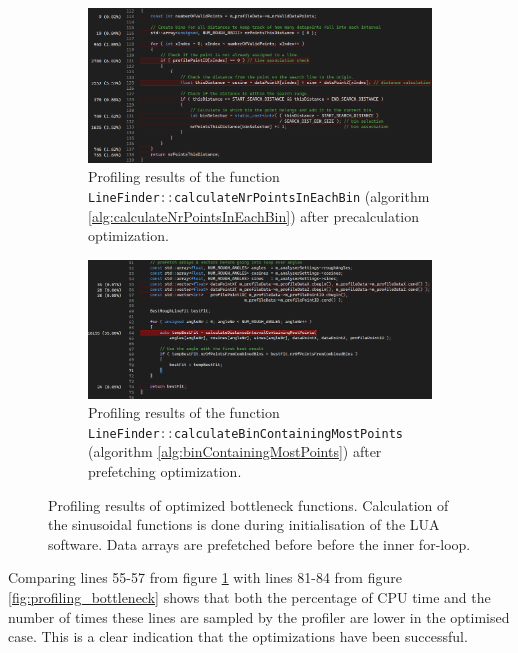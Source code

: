 \begin{figure}[H]
    \centering
    \begin{subfigure}{\textwidth}
        \centering
        \includegraphics[width=\textwidth]{images/profiling_bottleneck_optimized.png}
        \caption{Profiling results of the function \lstinline[language=c]|LineFinder::calculateNrPointsInEachBin| (algorithm \ref{alg:calculateNrPointsInEachBin}) after precalculation optimization.}
    \end{subfigure}
    \begin{subfigure}{\textwidth}
        \centering
        \includegraphics[width=\textwidth]{images/profiling_results_precalculation.png}
        \caption{Profiling results of the function \lstinline[language=c]|LineFinder::calculateBinContainingMostPoints| (algorithm \ref{alg:binContainingMostPoints}) after prefetching optimization.}\label{fig:profiling_results_precalculation}
    \end{subfigure}
    \caption{Profiling results of optimized bottleneck functions. Calculation of the sinusoidal functions is done during initialisation of the LUA software. Data arrays are prefetched before before the inner for-loop.}
    \label{fig:profiling_bottleneck_optimized}
\end{figure}

Comparing lines 55-57 from figure \ref{fig:profiling_results_precalculation} with lines 81-84 from figure \ref{fig:profiling_bottleneck} shows that both the percentage of CPU time and the number of times these lines are sampled by the profiler are lower in the optimised case. This is a clear indication that the optimizations have been successful.


